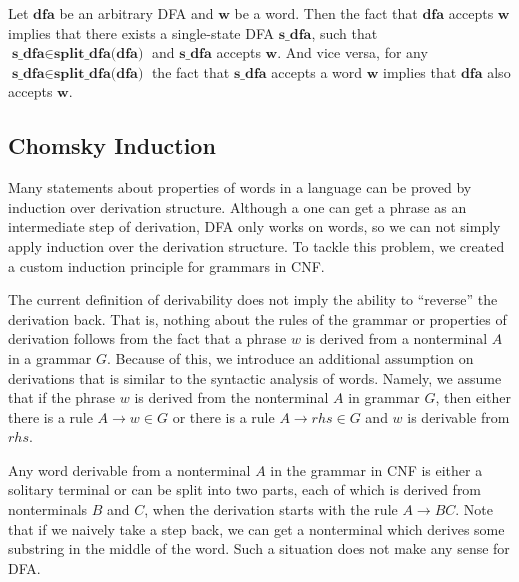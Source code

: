 \begin{theorem}
  Let $\textbf{dfa}$ be an arbitrary DFA and $\textbf{w}$ be a word. Then the fact that $\textbf{dfa}$ accepts $\textbf{w}$ implies that there exists a single-state DFA $\textbf{s\_dfa}$, such that $\textbf{s\_dfa} \in \textbf{split\_dfa(dfa)}$ and $\textbf{s\_dfa}$ accepts $\textbf{w}$. And vice versa, for any $\textbf{s\_dfa} \in \textbf{split\_dfa(dfa)}$ the fact that $\textbf{s\_dfa}$ accepts a word $\textbf{w}$ implies that $\textbf{dfa}$ also accepts $\textbf{w}$.
\end{theorem}

\subsection{Chomsky Induction}
\label{sec:chomsky-induction}

Many statements about properties of words in a language can be proved by induction over derivation structure.
Although a one can get a phrase as an intermediate step of derivation, DFA only works on words, so we can not simply apply induction over the derivation structure. To tackle this problem, we created a custom induction principle for grammars in CNF.

The current definition of derivability does not imply the ability to ``reverse'' the derivation back. That is, nothing about the rules of the grammar or properties of derivation follows from the fact that a phrase $w$ is derived from a nonterminal $A$ in a grammar $G$. Because of this, we introduce an additional assumption on derivations that is similar to the syntactic analysis of words.
Namely, we assume that if the phrase $w$ is derived from the nonterminal $A$ in grammar $G$, then either there is a rule $A \to w \in G$ or there is a rule $A \to rhs \in G$ and $w$ is derivable from $rhs$.



Any word derivable from a nonterminal $A$ in the grammar in CNF is either a solitary terminal or can be split into two parts, each of which is derived from nonterminals $B$ and $C$, when the derivation starts with the rule $A \to B C$.
Note that if we naively take a step back, we can get a nonterminal which derives some substring in the middle of the word.
Such a situation does not make any sense for DFA.

